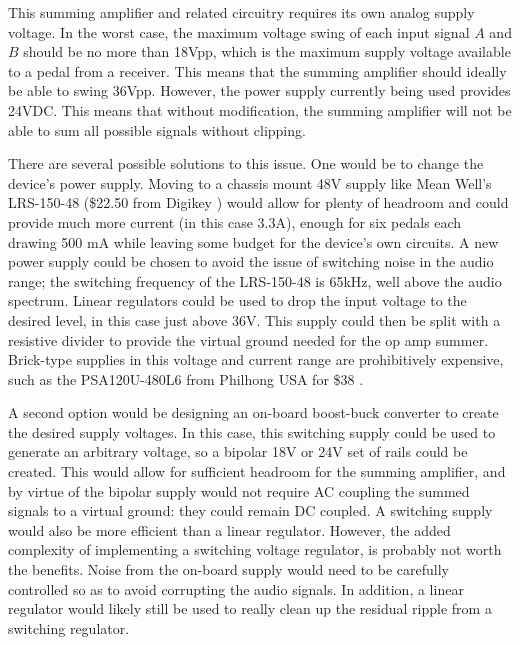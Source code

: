 	
	This summing amplifier and related circuitry requires its own analog supply voltage.  In the worst case, the maximum voltage swing of each input signal $A$ and $B$ should be no more than 18Vpp, which is the maximum supply voltage available to a pedal from a receiver.  This means that the summing amplifier should ideally be able to swing 36Vpp.  However, the power supply currently being used provides 24VDC.  This means that without modification, the summing amplifier will not be able to sum all possible signals without clipping.

	There are several possible solutions to this issue.  One would be to change the device's power supply.  Moving to a chassis mount 48V supply like Mean Well's LRS-150-48 \cite{datasheet:LRS-150-48} (\$22.50 from Digikey \cite{digikey}) would allow for plenty of headroom and could provide much more current (in this case 3.3A), enough for six pedals each drawing 500 mA while leaving some budget for the device's own circuits.  A new power supply could be chosen to avoid the issue of switching noise in the audio range; the switching frequency of the LRS-150-48 is 65kHz, well above the audio spectrum.  Linear regulators could be used to drop the input voltage to the desired level, in this case just above 36V.  This supply could then be split with a resistive divider to provide the virtual ground needed for the op amp summer.  Brick-type supplies in this voltage and current range are prohibitively expensive, such as the PSA120U-480L6 from Philhong USA for \$38 \cite{digikey}.

	A second option would be designing an on-board boost-buck converter to create the desired supply voltages.  In this case, this switching supply could be used to generate an arbitrary voltage, so a bipolar 18V or 24V set of rails could be created.  This would allow for sufficient headroom for the summing amplifier, and by virtue of the bipolar supply would not require AC coupling the summed signals to a virtual ground: they could remain DC coupled.  A switching supply would also be more efficient than a linear regulator.  However, the added complexity of implementing a switching voltage regulator, is probably not worth the benefits.  Noise from the on-board supply would need to be carefully controlled so as to avoid corrupting the audio signals.  In addition, a linear regulator would likely still be used to really clean up the residual ripple from a switching regulator.

